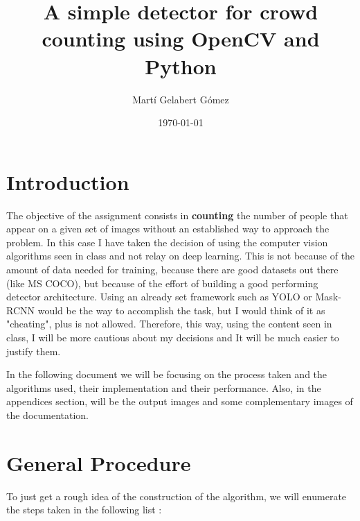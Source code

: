 \documentclass[10pt]{article}
\begin{document}
\title{A simple detector for crowd counting using OpenCV and Python}
\author{Martí Gelabert Gómez}
\date{\today}
\maketitle

\tableofcontents
\section{Introduction}
The objective of the assignment consists in \textbf{counting} the number of people that appear on a given set of images without an established way to approach the problem. In this case I have taken the decision of using the computer vision algorithms seen in class and not relay on deep learning. This is not because of the amount of data needed for training, because there are good datasets out there (like MS COCO), but because of the effort of building a good performing detector architecture. Using an already set framework such as YOLO or Mask-RCNN would be the way to accomplish the task, but I would think of it as "cheating", plus is not allowed. Therefore, this way, using the content seen in class, I will be more cautious about my decisions and It will be much easier to justify them.

In the following document  we will be focusing on the process taken and the algorithms used, their implementation and their performance. Also, in the appendices section, will be the output images and some complementary images of the documentation.

\section{General Procedure}
To just get a rough idea of the construction of the algorithm, we will enumerate the steps taken in the following list :
\end{document}
